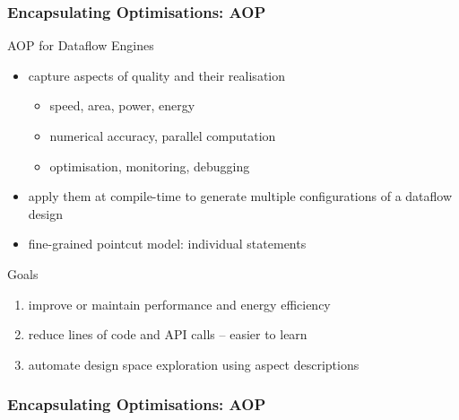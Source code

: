 \begin{frame}[fragile]
  \frametitle{Encapsulating Optimisations: AOP}
  \begin{beamerboxesrounded}{AOP for Dataflow Engines}
    \begin{itemize}
      \item capture aspects of quality and their realisation
        \begin{itemize}
          \item speed, area, power, energy
          \item numerical accuracy, parallel computation
          \item optimisation, monitoring, debugging
        \end{itemize}
      \item apply them at compile-time to generate multiple
        configurations of a dataflow design
      \item fine-grained pointcut model: individual statements
    \end{itemize}
  \end{beamerboxesrounded}
  \begin{beamerboxesrounded}{Goals}
    \begin{enumerate}
      \item improve or maintain performance and energy efficiency
      \item reduce lines of code and API calls -- easier to learn
      \item automate design space exploration using aspect descriptions
    \end{enumerate}
  \end{beamerboxesrounded}

\end{frame}

\begin{frame}[fragile]
  \frametitle{Encapsulating Optimisations: AOP}
  \begin{figure}[!ht]
  \centering
  \def\svgwidth{\textwidth}
  
\end{figure}
\end{frame}
